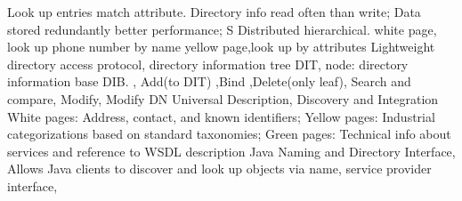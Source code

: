 Look up entries match attribute.
Directory info read often than write;
Data stored redundantly better performance;
S Distributed hierarchical.
white page, look up phone number by name
yellow page,look up by attributes
\textbar \textbar
{}
Lightweight directory access protocol,
directory information tree DIT,
node: directory information base DIB.
,
Add(to DIT)
,Bind
,Delete(only leaf),
Search and compare,
Modify,
Modify DN
Universal Description, Discovery and Integration
White pages:
Address, contact, and known identifiers;
Yellow pages:
Industrial categorizations based on standard taxonomies;
Green pages:
Technical info about services and reference to WSDL description
Java Naming and Directory Interface,
Allows Java clients to discover and look up objects via name,
service provider interface,
